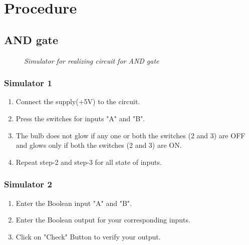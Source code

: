 \section{Procedure}
	\subsection{AND gate}
		\begin{figure}[ht]
			\centering 
			\hfill
			\caption{\textit{Simulator for realizing circuit for AND gate}}
		\end{figure}
		\subsubsection{Simulator 1}
			\begin{enumerate}
				\tightlist
				\item Connect the supply(+5V) to the circuit.
				\item Press the switches for inputs "A" and "B".			
				\item The bulb does not glow if any one or both the switches (2 and 3) are OFF and glows only if both the switches (2 and 3) are ON.
				\item Repeat step-2 and step-3 for all state of inputs.
			\end{enumerate}
		\subsubsection{Simulator 2}
			\begin{enumerate}
				\tightlist
				\item Enter the Boolean input "A" and "B".
				\item Enter the Boolean output for your corresponding inputs.
				\item Click on "Check" Button to verify your output.			
			\end{enumerate}	

